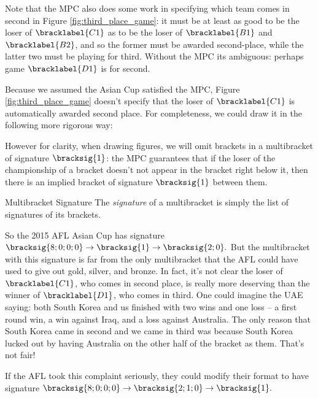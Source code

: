 {    Note that the MPC also does some work in specifying which team comes in second in Figure \ref{fig:third_place_game}: it must be at least as good to be the loser of $\bracklabel{C1}$ as to be the loser of $\bracklabel{B1}$ and $\bracklabel{B2}$, and so the former must be awarded second-place, while the latter two must be playing for third. Without the MPC its ambiguous: perhaps game $\bracklabel{D1}$ is for second.

    Because we assumed the Asian Cup satisfied the MPC, Figure \ref{fig:third_place_game} doesn't specify that the loser of $\bracklabel{C1}$ is automatically awarded second place. For completeness, we could draw it in the following more rigorous way:


    However for clarity, when drawing figures, we will omit brackets in a multibracket of signature $\bracksig{1}$: the MPC guarantees that if the loser of the championship of a bracket doesn't not appear in the bracket right below it, then there is an implied bracket of signature $\bracksig{1}$ between them.

    \begin{definition}{Multibracket Signature}{}
        The \textit{signature} of a multibracket is simply the list of signatures of its brackets.
    \end{definition}

    So the 2015 AFL Asian Cup has signature $\bracksig{8;0;0;0} \to \bracksig{1} \to \bracksig{2;0}.$ But the multibracket with this signature is far from the only multibracket that the AFL could have used to give out gold, silver, and bronze. In fact, it's not clear the loser of $\bracklabel{C1}$, who comes in second place, is really more deserving than the winner of $\bracklabel{D1}$, who comes in third. One could imagine the UAE saying: both South Korea and us finished with two wins and one loss -- a first round win, a win against Iraq, and a loss against Australia. The only reason that South Korea came in second and we came in third was because South Korea lucked out by having Australia on the other half of the bracket as them. That's not fair!

    If the AFL took this complaint seriously, they could modify their format to have signature $\bracksig{8;0;0;0} \to \bracksig{2; 1; 0} \to \bracksig{1}.$
    

}
